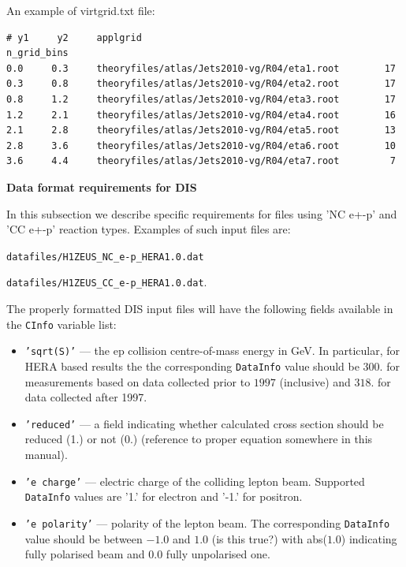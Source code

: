 An example of virtgrid.txt file:
\begin{verbatim}
# y1     y2     applgrid                                        n_grid_bins
0.0     0.3     theoryfiles/atlas/Jets2010-vg/R04/eta1.root        17
0.3     0.8     theoryfiles/atlas/Jets2010-vg/R04/eta2.root        17
0.8     1.2     theoryfiles/atlas/Jets2010-vg/R04/eta3.root        17
1.2     2.1     theoryfiles/atlas/Jets2010-vg/R04/eta4.root        16
2.1     2.8     theoryfiles/atlas/Jets2010-vg/R04/eta5.root        13
2.8     3.6     theoryfiles/atlas/Jets2010-vg/R04/eta6.root        10
3.6     4.4     theoryfiles/atlas/Jets2010-vg/R04/eta7.root         7
\end{verbatim}


\begin{description}
\item \bf{Data format requirements for DIS}\rm

In this subsection we describe specific requirements for files using 'NC e+-p' and 'CC e+-p'
reaction types. Examples of such input files are:

{\tt datafiles/H1ZEUS\_NC\_e-p\_HERA1.0.dat}

{\tt datafiles/H1ZEUS\_CC\_e-p\_HERA1.0.dat}.

The properly formatted DIS input files will have the following fields available
in the {\tt CInfo} variable list: 

\begin{itemize} 
    \item  {\tt 'sqrt(S)'} --- the ep collision centre-of-mass energy in GeV. In particular, for 
    HERA based results the the corresponding {\tt DataInfo} value should be $300.$ for measurements
    based on data collected prior to $1997$ (inclusive) and $318.$ for data collected after 1997.
    
    \item {\tt 'reduced'} --- a field indicating whether calculated cross section should be reduced (1.) or not (0.)
    (reference to proper equation somewhere in this manual).
    
    \item {\tt 'e charge'} --- electric charge of the colliding lepton beam. Supported {\tt DataInfo} values
    are '1.' for electron and '-1.' for positron.

    \item {\tt 'e polarity'} --- polarity of the lepton beam. The corresponding {\tt DataInfo} value 
    should be between $-1.0$ and $1.0$ (is this true?) with abs($1.0$) indicating fully polarised
    beam and $0.0$ fully unpolarised one. 


\end{itemize}
\end{description}
